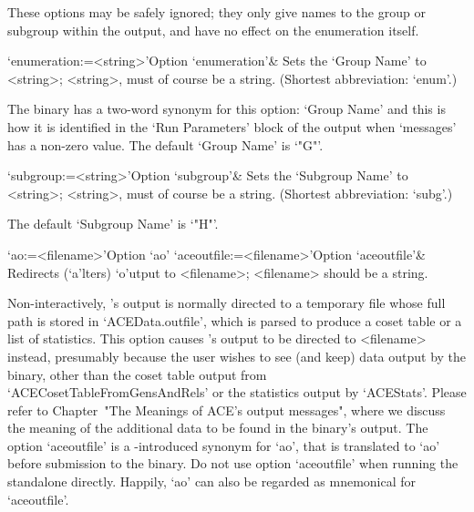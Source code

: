 These options may be safely ignored; they only give names to the group
or subgroup within the {\ACE}  output,  and  have  no  effect  on  the
enumeration itself.

\beginitems

\>`enumeration:=<string>'{Option `enumeration'}&
Sets the `Group Name' to <string>;  <string>,  must  of  course  be  a
string. (Shortest abbreviation: `enum'.)

The {\ACE} binary has a two-word synonym for this option: `Group Name'
and this is how it is identified in the \lq{}Run Parameters' block  of
the {\ACE} output when `messages' has a non-zero  value.  The  default
`Group Name' is `"G"'.

\>`subgroup:=<string>'{Option `subgroup'}& Sets the `Subgroup Name' to
<string>; <string>, must of course be a string.
(Shortest abbreviation: `subg'.) 

The default `Subgroup Name' is `"H"'.

\enditems


\beginitems

\>`ao:=<filename>'{Option `ao'}
\>`aceoutfile:=<filename>'{Option `aceoutfile'}&
Redirects (`a'lters) `o'utput to <filename>; <filename>  should  be  a
string.

Non-interactively, {\ACE}'s output is normally directed to a temporary
file whose full path is stored in `ACEData.outfile', which  is  parsed
to produce a coset table or a list of statistics. This  option  causes
{\ACE}'s output to  be  directed  to  <filename>  instead,  presumably
because the user wishes to see (and keep) data output  by  the  {\ACE}
binary,    other    than    the    coset     table     output     from
`ACECosetTableFromGensAndRels' or the statistics output by `ACEStats'.
Please refer to Chapter~"The Meanings of ACE's output messages", where
we discuss the meaning of the additional  data  to  be  found  in  the
{\ACE} binary's output. The option `aceoutfile' is a {\GAP}-introduced
synonym for `ao', that is translated to `ao' before submission to  the
{\ACE} binary.  Do  not  use  option  `aceoutfile'  when  running  the
standalone directly. Happily, `ao' can also be regarded as  mnemonical
for `aceoutfile'.

\enditems


